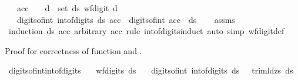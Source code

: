 \begin{isabellebody}
\ \ \ {\isachardoublequoteopen}acc\ {\isachargreater}{\kern0pt}\ {}{\isachardoublequoteclose}\ \ {\isachardoublequoteopen}{\isasymforall}d\ {\isasymin}\ set\ ds{\isachardot}{\kern0pt}\ wf{\isacharunderscore}{\kern0pt}digit\ d{\isachardoublequoteclose}\isanewline
\ \ \ {\isachardoublequoteopen}digits{\isacharunderscore}{\kern0pt}of{\isacharunderscore}{\kern0pt}int\ {\isacharparenleft}{\kern0pt}int{\isacharunderscore}{\kern0pt}of{\isacharunderscore}{\kern0pt}digits\ ds\ acc{\isacharparenright}{\kern0pt}\ {\isacharequal}{\kern0pt}\ digits{\isacharunderscore}{\kern0pt}of{\isacharunderscore}{\kern0pt}int\ acc\ {\isacharat}{\kern0pt}\ ds{\isachardoublequoteclose}\isanewline
%
\isadelimproof
\ \ %
\endisadelimproof
%
\isatagproof
{}\isamarkupfalse%
\ assms\isanewline
\ \ \isamarkupfalse%
\ {\isacharparenleft}{\kern0pt}induction\ ds\ acc\ arbitrary{\isacharcolon}{\kern0pt}\ acc\ rule{\isacharcolon}{\kern0pt}\ int{\isacharunderscore}{\kern0pt}of{\isacharunderscore}{\kern0pt}digits{\isachardot}{\kern0pt}induct{\isacharparenright}{\kern0pt}\ {\isacharparenleft}{\kern0pt}auto\ simp{\isacharcolon}{\kern0pt}\ wf{\isacharunderscore}{\kern0pt}digit{\isacharunderscore}{\kern0pt}def{\isacharparenright}{\kern0pt}%
\endisatagproof
{\isafoldproof}%
%
\isadelimproof
%
\endisadelimproof
%
\begin{isamarkuptext}%
Proof for correctness of function  and .%
\end{isamarkuptext}\isamarkuptrue%
\isamarkupfalse%
\ digits{\isacharunderscore}{\kern0pt}of{\isacharunderscore}{\kern0pt}int{\isacharunderscore}{\kern0pt}int{\isacharunderscore}{\kern0pt}of{\isacharunderscore}{\kern0pt}digits{\isacharcolon}{\kern0pt}\isanewline
\ \ \ {\isachardoublequoteopen}wf{\isacharunderscore}{\kern0pt}digits\ ds{\isachardoublequoteclose}\isanewline
\ \ \ {\isachardoublequoteopen}digits{\isacharunderscore}{\kern0pt}of{\isacharunderscore}{\kern0pt}int\ {\isacharparenleft}{\kern0pt}int{\isacharunderscore}{\kern0pt}of{\isacharunderscore}{\kern0pt}digits\ ds\ {}{\isacharparenright}{\kern0pt}\ {\isacharequal}{\kern0pt}\ trim{\isacharunderscore}{\kern0pt}ld{\isacharunderscore}{\kern0pt}zs\ ds{\isachardoublequoteclose}\isanewline
%
\isadelimproof
\ \ %
\endisadelimproof
%
\isatagproof

\end{isabellebody}
